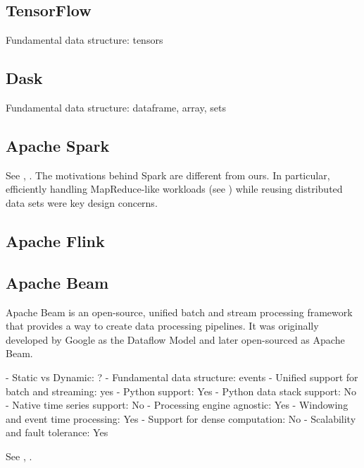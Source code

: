 \documentclass[11pt, reqno]{amsart}
\theoremstyle{definition}
\theoremstyle{remark}
\begin{document}
\subsection{TensorFlow}
Fundamental data structure: tensors

\subsection{Dask}
Fundamental data structure: dataframe, array, sets

\subsection{Apache Spark}

See \cite{ZhChFrShSt10}, \cite{ShMoAlNa19}. The motivations behind Spark are
different from ours. In particular, efficiently handling MapReduce-like
workloads (see \cite{DeGh08}) while reusing distributed data sets were key
design concerns.

\subsection{Apache Flink}

\subsection{Apache Beam}

Apache Beam is an open-source, unified batch and stream processing framework
that provides a way to create data processing pipelines. It was originally
developed by Google as the Dataflow Model and later open-sourced as Apache
Beam.

- Static vs Dynamic: ?
- Fundamental data structure: events
- Unified support for batch and streaming: yes
- Python support: Yes
- Python data stack support: No
- Native time series support: No
- Processing engine agnostic: Yes
- Windowing and event time processing: Yes
- Support for dense computation: No
- Scalability and fault tolerance: Yes

See \cite{Aketal13}, \cite{Aketal15}.
\end{document}
